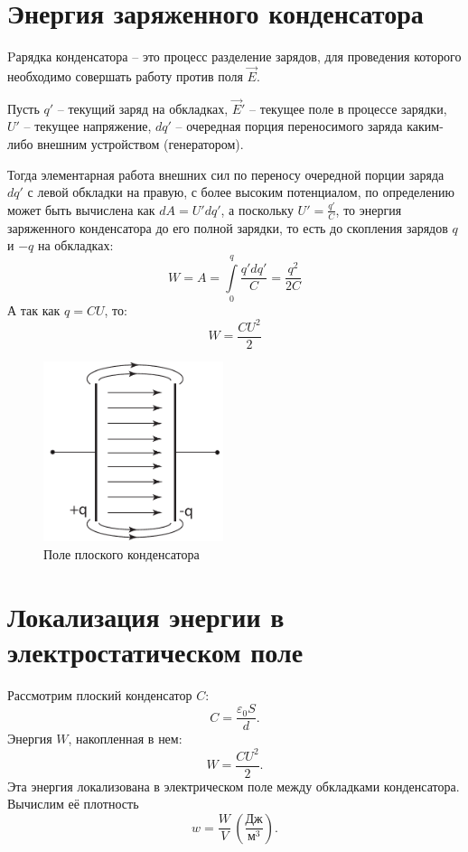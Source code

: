 \section{Энергия заряженного конденсатора}

    Pарядка конденсатора -- это процесс разделение зарядов, для проведения
    которого необходимо совершать работу против поля \( \vec{E} \).

    Пусть \( q' \) -- текущий заряд на обкладках, \( \vec{E}' \) -- текущее
    поле в процессе зарядки, \( U' \) -- текущее напряжение, \( dq' \) --
    очередная порция переносимого заряда каким-либо внешним устройством 
    (генератором).

    Тогда элементарная работа внешних сил по переносу очередной порции заряда
    \( dq' \) с левой обкладки на правую, с более высоким потенциалом, по 
    определению может быть вычислена как \( dA = U' dq' \), а поскольку
    \( U' = \frac{q'}{C} \), то энергия заряженного конденсатора до его полной 
    зарядки, то есть до скопления зарядов \( q \) и \(-q \) на обкладках:
    \[
        W = A = \int\limits_0^q \frac{q' dq'}{C} = \frac{q^2}{2C}
    \]
    А так как \( q = CU \), то:
    \begin{equation}
        \label{eq4:C3}
        W = \frac{CU^2}{2}
    \end{equation}

    \begin{figure}[b!]
        \center
        \includegraphics[width=0.47\textwidth]{lec04/flat_capacitor_field.pdf}
        \caption{Поле плоского конденсатора}
    \end{figure}

\section{Локализация энергии в электростатическом поле}

    Рассмотрим плоский конденсатор \( C \):
    \[
        C = \frac{\varepsilon_0 S}{d}.
    \]
    Энергия \( W \), накопленная в нем:
    \[
        W = \frac{CU^2}{2}.
    \]
    Эта энергия локализована в электрическом поле между обкладками конденсатора.
    Вычислим её плотность
    \[
        w = \frac{W}{V} \, \left(\frac{\text{Дж}}{\text{м}^3}\right).
    \]

